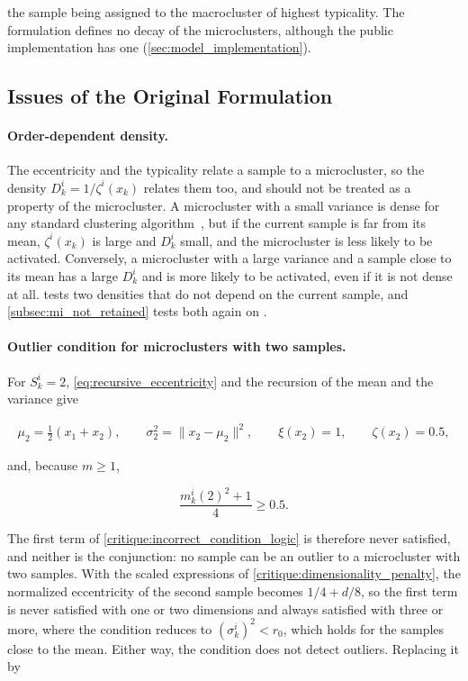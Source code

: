 the sample being assigned to the macrocluster of highest typicality. The formulation defines no decay of the microclusters, although the public implementation has one (\cref{sec:model_implementation}).

\subsection{Issues of the Original Formulation}

\paragraph{Order-dependent density.}
\label{subsubsec:order_dependent_characteristics}
The eccentricity and the typicality relate a sample to a microcluster, so the density $D^i_k = 1 / \zeta^i(x_k)$ relates them too, and should not be treated as a property of the microcluster. A microcluster with a small variance is dense for any standard clustering algorithm~\cite{ester1996density,aggarwal2003framework,cao2006density}, but if the current sample is far from its mean, $\zeta^i(x_k)$ is large and $D^i_k$ small, and the microcluster is less likely to be activated. Conversely, a microcluster with a large variance and a sample close to its mean has a large $D^i_k$ and is more likely to be activated, even if it is not dense at all.  tests two densities that do not depend on the current sample, and \cref{subsec:mi_not_retained} tests both again on \MicroTEDAClusPlus.

\paragraph{Outlier condition for microclusters with two samples.}
\label{subsubsec:incorrect_condition_logic}
For $S^i_k = 2$, \cref{eq:recursive_eccentricity} and the recursion of the mean and the variance give

\begin{gather}
    \mu_2 = \frac{1}{2} \left( x_1 + x_2 \right), \qquad
    \sigma^2_2 = \lVert x_2 - \mu_2 \rVert^2, \qquad
    \xi(x_2) = 1, \qquad
    \zeta(x_2) = 0.5,
\end{gather}

and, because $m \ge 1$,

\begin{equation}
    \frac{m^i_k(2)^2 + 1}{4} \ge 0.5.
\end{equation}

The first term of \cref{critique:incorrect_condition_logic} is therefore never satisfied, and neither is the conjunction: no sample can be an outlier to a microcluster with two samples. With the scaled expressions of \cref{critique:dimensionality_penalty}, the normalized eccentricity of the second sample becomes $1/4 + d/8$, so the first term is never satisfied with one or two dimensions and always satisfied with three or more, where the condition reduces to $\left( \sigma^i_k \right)^2 < r_0$, which holds for the samples close to the mean. Either way, the condition does not detect outliers. Replacing it by

